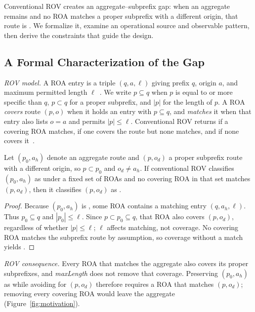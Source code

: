 \label{sec:background}

Conventional ROV creates an aggregate--subprefix gap: when an aggregate remains \valid{} and no ROA matches a proper subprefix with a different origin, that route is \invalid{}. We formalize it, examine an operational source and observable pattern, then derive the constraints that guide the design.

\subsection{A Formal Characterization of the Gap}
\label{sec:formal-dilemma}

\emph{ROV model.} A ROA entry is a triple $(q,a,\ell)$ giving prefix $q$, origin $a$, and maximum permitted length $\ell$~\cite{rfc6480,rfc9582}. We write $p\subseteq q$ when $p$ is equal to or more specific than $q$, $p\subset q$ for a proper subprefix, and $|p|$ for the length of $p$. A ROA \emph{covers} route $(p,o)$ when it holds an entry with $p\subseteq q$, and \emph{matches} it when that entry also lists $o=a$ and permits $|p|\leq\ell$. Conventional ROV returns \valid{} if a covering ROA matches, \invalid{} if one covers the route but none matches, and \notfound{} if none covers it~\cite{rfc6811,rfc8481}.

\begin{proposition}
\label{prop:aggregate-subprefix-dilemma}
Let $(p_0,a_h)$ denote an aggregate route and $(p,o_d)$ a proper subprefix route with a different origin, so $p\subset p_0$ and $o_d\neq a_h$. If conventional ROV classifies $(p_0,a_h)$ as \valid{} under a fixed set of ROAs and no covering ROA in that set matches $(p,o_d)$, then it classifies $(p,o_d)$ as \invalid{}.
\end{proposition}
\begin{proof}
Because $(p_0,a_h)$ is \valid{}, some ROA contains a matching entry $(q,a_h,\ell)$. Thus $p_0\subseteq q$ and $|p_0|\leq\ell$. Since $p\subset p_0\subseteq q$, that ROA also covers $(p,o_d)$, regardless of whether $|p|\leq\ell$; $\ell$ affects matching, not coverage. No covering ROA matches the subprefix route by assumption, so coverage without a match yields \invalid{}.
\end{proof}

\emph{ROV consequence.} Every ROA that matches the aggregate also covers its proper subprefixes, and \emph{maxLength} does not remove that coverage. Preserving $(p_0,a_h)$ as \valid{} while avoiding \invalid{} for $(p,o_d)$ therefore requires a ROA that matches $(p,o_d)$; removing every covering ROA would leave the aggregate \notfound{} (Figure~\ref{fig:motivation}).

